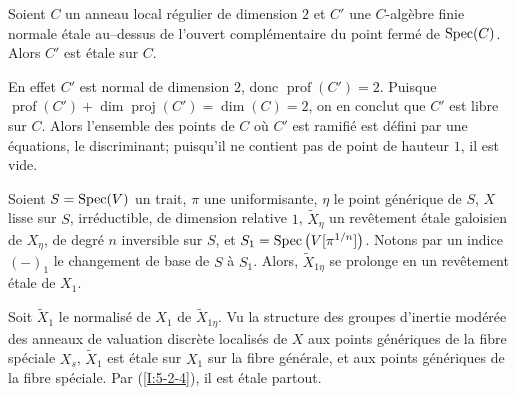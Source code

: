 \begin{lemma} \label{I:5-2-4} %
Soient $C$ un anneau local régulier de dimension $2$ et $C'$ une $C$-algèbre 
finie normale étale au--dessus de l'ouvert complémentaire du point fermé 
de $\operatorname{Spec}(C)$. Alors $C'$ est étale sur $C$.
\end{lemma}

En effet $C'$ est normal de dimension $2$, donc $\operatorname{prof}(C')=2$. 
Puisque $\operatorname{prof}(C')+\dim\operatorname{proj}(C') = \dim(C)=2$, on 
en conclut que $C'$ est libre sur $C$. Alors l'ensemble des points de $C$ où 
$C'$ est ramifié est défini par une équations, le discriminant; puisqu'il 
ne contient pas de point de hauteur $1$, il est vide. 





\begin{lemma}\label{I:5-2-5} %
Soient $S=\operatorname{Spec}(V)$ un trait, $\pi$ une uniformisante, $\eta$ le point 
générique de $S$, $X$ lisse sur $S$, irréductible, de dimension 
relative $1$, $\widetilde X_\eta$ un revêtement étale galoisien de $X_\eta$, 
de degré $n$ inversible sur $S$, et $S_1=\operatorname{Spec}\left(V[\pi^{1/n}]\right)$. 
Notons par un indice $(-)_1$ le changement de base de $S$ à $S_1$. Alors, 
$\widetilde X_{1\eta}$ se prolonge en un revêtement étale de $X_1$. 
\end{lemma}

Soit $\widetilde X_1$ le normalisé de $X_1$ de $\widetilde X_{1\eta}$. Vu la 
structure des groupes d'inertie modérée des anneaux de valuation discrète 
localisés de $X$ aux points génériques de la fibre spéciale $X_s$, 
$\widetilde X_1$ est étale sur $X_1$ sur la fibre générale, et aux points 
génériques de la fibre spéciale. Par (\ref{I:5-2-4}), il est étale 
partout. 





\subsubsection{}\label{I:5-2-6} %

